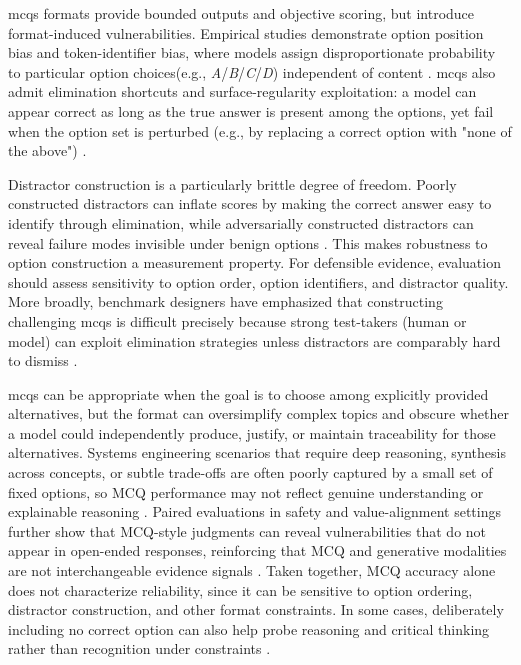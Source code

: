 \acp{mcq} formats provide bounded outputs and objective scoring, but introduce format-induced vulnerabilities. Empirical studies demonstrate option position bias and token-identifier bias, where models assign disproportionate probability to particular option choices(e.g., \emph{A}/\emph{B}/\emph{C}/\emph{D}) independent of content \cite{zheng_LargeLanguageModelsAre_2024}. \acp{mcq} also admit elimination shortcuts and surface-regularity exploitation: a model can appear correct as long as the true answer is present among the options, yet fail when the option set is perturbed (e.g., by replacing a correct option with "none of the above") \cite{wang_AnswersReviewingRationality_2024}. 

Distractor construction is a particularly brittle degree of freedom. Poorly constructed distractors can inflate scores by making the correct answer easy to identify through elimination, while adversarially constructed distractors can reveal failure modes invisible under benign options \cite{ghanem_DISTO_2023, yigitAdversarialDistractorGeneration2025}. This makes robustness to option construction a measurement property. For defensible evidence, evaluation should assess sensitivity to option order, option identifiers, and distractor quality. More broadly, benchmark designers have emphasized that constructing challenging \acp{mcq} is difficult precisely because strong test-takers (human or model) can exploit elimination strategies unless distractors are comparably hard to dismiss \cite{TidorVlad_Pricope_2025_HardML_Benchmark}.

\acp{mcq} can be appropriate when the goal is to choose among explicitly provided alternatives, but the format can oversimplify complex topics and obscure whether a model could independently produce, justify, or maintain traceability for those alternatives. Systems engineering scenarios that require deep reasoning, synthesis across concepts, or subtle trade-offs are often poorly captured by a small set of fixed options, so MCQ performance may not reflect genuine understanding or explainable reasoning \cite{zheng_LargeLanguageModelsAre_2024, fu_mcq_reasoning_more_confident_when_wrong_2025}. Paired evaluations in safety and value-alignment settings further show that MCQ-style judgments can reveal vulnerabilities that do not appear in open-ended responses, reinforcing that MCQ and generative modalities are not interchangeable evidence signals \cite{wang_fake_alignment_2024}. Taken together, MCQ accuracy alone does not characterize reliability, since it can be sensitive to option ordering, distractor construction, and other format constraints. In some cases, deliberately including no correct option can also help probe reasoning and critical thinking rather than recognition under constraints \cite{goral_when_all_options_are_wrong_2024}.

